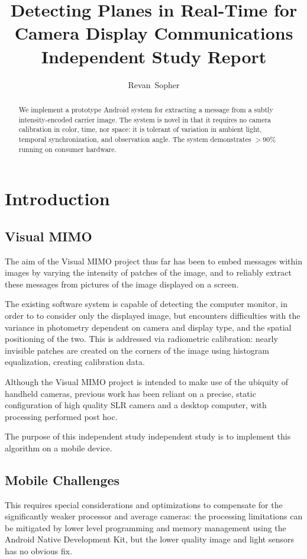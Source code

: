 \documentclass[11pt, letterpaper]{article}
\author{Revan~Sopher}
\title{Detecting Planes in Real-Time for Camera Display Communications\\
{\large Independent Study Report}}
\begin{document}
\maketitle

\begin{abstract}
We implement a prototype Android system for extracting a message from a subtly intensity-encoded carrier image.
The system is novel in that it requires no camera calibration in color, time, nor space: it is tolerant of variation in ambient light, temporal synchronization, and observation angle. The system demonstrates $>90 \%$ running on consumer hardware.
\end{abstract}

\section{Introduction}

\subsection{Visual MIMO}
The aim of the Visual MIMO project thus far has been to embed messages within images by varying the intensity of patches of the image, and to reliably extract these messages from pictures of the image displayed on a screen.

The existing software system is capable of detecting the computer monitor, in order to to consider only the displayed image, but encounters difficulties with the variance in photometry dependent on camera and display type, and the spatial positioning of the two.
This is addressed via radiometric calibration: nearly invisible patches are created on the corners of the image using histogram equalization, creating calibration data.

Although the Visual MIMO project is intended to make use of the ubiquity of handheld cameras, previous work has been reliant on a precise, static configuration of high quality SLR camera and a desktop computer, with processing performed post hoc.

The purpose of this independent study independent study is to implement this algorithm on a mobile device.

\subsection{Mobile Challenges}

This requires special considerations and optimizations to compensate for the significantly weaker processor and average cameras: the processing limitations can be mitigated by lower level programming and memory management using the Android Native Development Kit, but the lower quality image and light sensors has no obvious fix.
\end{document}
